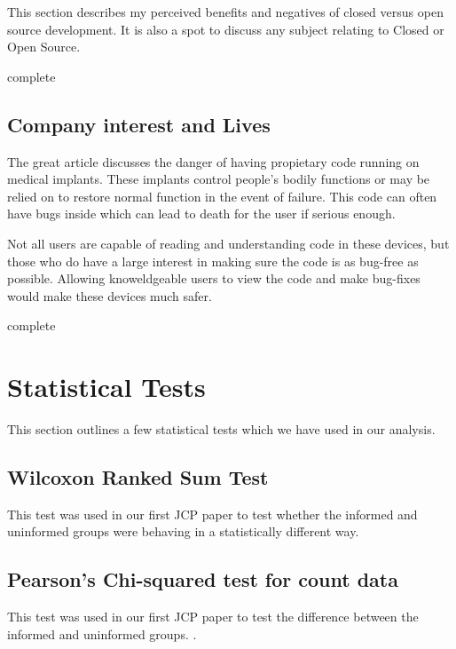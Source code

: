 \documentclass[american]{article}
\newcommand{\complete}{
	\gls{complete}
}
\begin{document}
This section describes my perceived benefits and negatives of closed versus open source development. It is also a spot to discuss any subject relating to Closed or Open Source.

\complete

\subsection{Company interest and Lives} \label{sec:closed-v-open-company}

The great article \cite{killed-by-code} discusses the danger of having propietary code running on medical implants. These implants control people's bodily functions or may be relied on to restore normal function in the event of failure. This code can often have bugs inside which can lead to death for the user if serious enough.

Not all users are capable of reading and understanding code in these devices, but those who do have a large interest in making sure the code is as bug-free as possible. Allowing knoweldgeable users to view the code and make bug-fixes would make these devices much safer.

\complete

\section{Statistical Tests} \label{sec:statistical}

This section outlines a few statistical tests which we have used in our analysis.

\subsection{Wilcoxon Ranked Sum Test} \label{sec:statistical-wilcoxon}

This test was used in our first JCP paper to test whether the informed and uninformed groups were behaving in a statistically different way. \cite{wilcoxon-test,R-wilcoxon-test}

\subsection{Pearson's Chi-squared test for count data} \label{sec:statistical-pearson-chisquare}

This test was used in our first JCP paper to test the difference between the informed and uninformed groups. \cite{pearson-chisquare,R-pearson-chisquare}.
\end{document}
